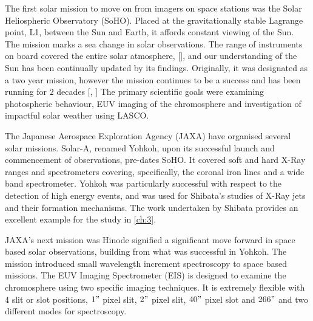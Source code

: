 The first solar mission to move on from imagers on space stations was the Solar Heliospheric Observatory (SoHO).
Placed at the gravitationally stable Lagrange point, L1, between the Sun and Earth, it affords constant viewing of the Sun.
The mission marks a sea change in solar observations.
The range of instruments on board covered the entire solar atmosphere, [\cite{StCyr1995}], and our understanding of the Sun has been continually updated by its findings.
Originally, it was designated as a two year mission, however the mission continues to be a success and has been running for $2$ decades [\cite{Fleck2006}, \cite{Fleck2016}]
The primary scientific goals were examining photospheric behaviour, EUV imaging of the chromosphere and investigation of impactful solar weather using LASCO.



The Japanese Aerospace Exploration Agency (JAXA) have organised several solar missions.
Solar-A, renamed Yohkoh, \cite{Tsuneta1991} upon its successful launch and commencement of observations, pre-dates SoHO.
It covered soft and hard X-Ray ranges and spectrometers covering, specifically, the coronal iron lines and a wide band spectrometer. 
Yohkoh was particularly successful with respect to the detection of high energy events, and was used for Shibata's studies of X-Ray jets and their formation mechanisms.
The work undertaken by Shibata provides an excellent example for the study in \cref{ch:3}.
 
JAXA's next mission was Hinode signified a significant move forward in space based solar observations, building from what was successful in Yohkoh.
The mission introduced small wavelength increment spectroscopy to space based missions.
The EUV Imaging Spectrometer (EIS) is designed to examine the chromosphere using two specific imaging techniques.
It is extremely flexible with 4 slit or slot positions, $1"$ pixel slit, $2"$ pixel slit, $40"$ pixel slot and $266"$ and two different modes for spectroscopy.

